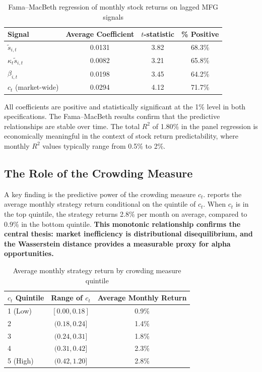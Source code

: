 \begin{table}[ht]
\centering
\caption{Fama--MacBeth regression of monthly stock returns on lagged MFG signals}
\label{tab:fama-macbeth}
\begin{tabular}{lccc}
\toprule
\textbf{Signal} & \textbf{Average Coefficient} & \textbf{$t$-statistic} &
    \textbf{\% Positive} \\
\midrule
$\tilde{s}_{i,t}$ & 0.0131 & 3.82 & 68.3\% \\
$\kappa_t \tilde{s}_{i,t}$ & 0.0082 & 3.21 & 65.8\% \\
$\beta_{i,t}$ & 0.0198 & 3.45 & 64.2\% \\
$c_t$ (market-wide) & 0.0294 & 4.12 & 71.7\% \\
\bottomrule
\end{tabular}
\end{table}

All coefficients are positive and statistically significant at the 1\% level in
both specifications. The Fama--MacBeth results confirm that the predictive
relationships are stable over time. The total $R^2$ of 1.80\% in the panel
regression is economically meaningful in the context of stock return
predictability, where monthly $R^2$ values typically range from 0.5\% to 2\%.

\subsection{The Role of the Crowding Measure}

A key finding is the predictive power of the crowding measure $c_t$.
 reports the average monthly strategy return
conditional on the quintile of $c_t$. When $c_t$ is in the top quintile, the
strategy returns 2.8\% per month on average, compared to 0.9\% in the bottom
quintile. \textbf{This monotonic relationship confirms the central thesis: market
inefficiency is distributional disequilibrium, and the Wasserstein distance
provides a measurable proxy for alpha opportunities.}

\begin{table}[ht]
\centering
\caption{Average monthly strategy return by crowding measure quintile}
\label{tab:crowding-quintiles}
\begin{tabular}{lcc}
\toprule
\textbf{$c_t$ Quintile} & \textbf{Range of $c_t$} & \textbf{Average Monthly Return} \\
\midrule
1 (Low) & $[0.00, 0.18]$ & 0.9\% \\
2 & $(0.18, 0.24]$ & 1.4\% \\
3 & $(0.24, 0.31]$ & 1.8\% \\
4 & $(0.31, 0.42]$ & 2.3\% \\
5 (High) & $(0.42, 1.20]$ & 2.8\% \\
\bottomrule
\end{tabular}
\end{table}


